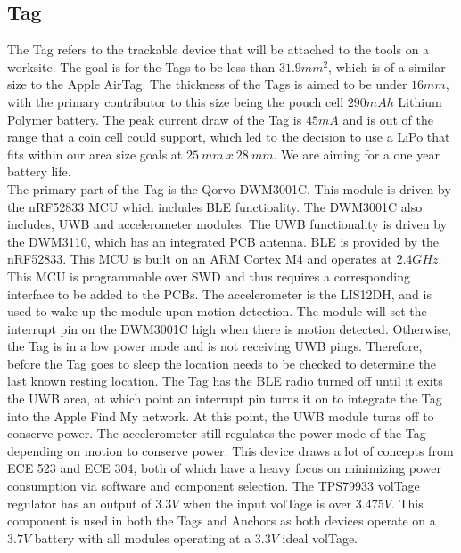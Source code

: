 \documentclass[conference]{IEEEtran}
\begin{document}
\subsection{Tag}\label{AA}
The Tag refers to the trackable device that will be attached to the tools 
on a worksite. The goal is for the Tags to be less than $31.9mm^2$, which is 
of a similar size to the Apple AirTag. The thickness of the Tags is aimed 
to be under $16mm$, with the primary contributor to this size being the 
pouch cell $290mAh$ Lithium Polymer battery. The peak current draw of the 
Tag is $45mA$ and is out of the range that a coin cell could support, 
which led to the decision to use a LiPo that fits within our area size 
goals at $25 \ mm \ x \ 28\ mm$. We are aiming for a one year battery life.
\\The primary part of the Tag is the Qorvo DWM3001C. This module is driven 
by the nRF52833 MCU which includes BLE functioality. The DWM3001C also includes, 
UWB and accelerometer modules. The UWB functionality is driven by the DWM3110,
which has an integrated PCB antenna. BLE is provided by the nRF52833. This MCU is built on an ARM Cortex 
M4 and operates at $2.4GHz$. This MCU is programmable over 
SWD and thus requires a corresponding interface to be added to the PCBs. 
The accelerometer is the LIS12DH, and is used to wake up the module 
upon motion detection. The module will set the interrupt pin on the 
DWM3001C high when there is motion detected. Otherwise, the Tag is in a 
low power mode and is not receiving UWB pings. 
Therefore, before the Tag goes to sleep the location needs to be checked 
to determine the last known resting location. The Tag has the BLE radio turned off 
until it exits the UWB area, at which point an interrupt pin turns 
it on to integrate the Tag into the Apple Find My network. At this point, the 
UWB module turns off to conserve power. The accelerometer still regulates 
the power mode of the Tag depending on motion to conserve power. This
device draws a lot of concepts from ECE 523 and ECE 304, both of which 
have a heavy focus on minimizing power consumption via software and 
component selection. The TPS79933 volTage regulator has an output of 
$3.3V$ when the input volTage is over $3.475V$. This component is used in 
both the Tags and Anchors as both devices operate on a $3.7V$ battery 
with all modules operating at a $3.3V$ ideal volTage. 
\end{document}
